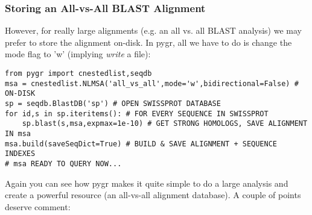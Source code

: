 \documentclass{howto}
\begin{document}
\subsubsection{Storing an All-vs-All BLAST Alignment}
However, for really large
alignments (e.g. an all vs. all BLAST analysis) we may prefer to store the alignment
on-disk.  In pygr, all we have to do is change the mode flag to 'w' (implying {\em write}
a file):
\begin{verbatim}
from pygr import cnestedlist,seqdb
msa = cnestedlist.NLMSA('all_vs_all',mode='w',bidirectional=False) # ON-DISK
sp = seqdb.BlastDB('sp') # OPEN SWISSPROT DATABASE
for id,s in sp.iteritems(): # FOR EVERY SEQUENCE IN SWISSPROT
    sp.blast(s,msa,expmax=1e-10) # GET STRONG HOMOLOGS, SAVE ALIGNMENT IN msa
msa.build(saveSeqDict=True) # BUILD & SAVE ALIGNMENT + SEQUENCE INDEXES
# msa READY TO QUERY NOW...
\end{verbatim}
Again you can see how pygr makes it quite simple to do a large analysis
and create a powerful resource (an all-vs-all alignment database).
A couple of points deserve comment:
\end{document}
